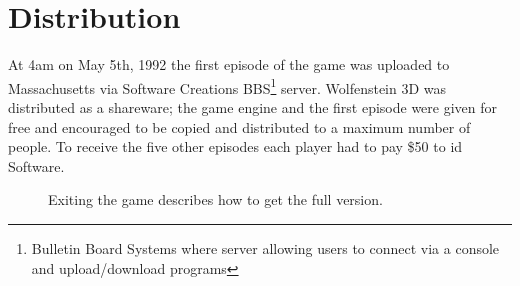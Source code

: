 \documentclass[book.tex]{subfiles}
\begin{document}
\section{Distribution}
At 4am on May 5th, 1992 the first episode of the game was uploaded to Massachusetts via Software Creations BBS\footnote{Bulletin Board Systems where server allowing users to connect via a console and upload/download programs} server. Wolfenstein 3D was distributed as a shareware; the game engine and the first episode were given for free and encouraged to be copied and distributed to a maximum number of people. To receive the five other episodes each player had to pay \$50 to id Software.\\
\par
\begin{figure}[H]
\centering
 \caption{Exiting the game describes how to get the full version.}
 \end{figure}
\end{document}

